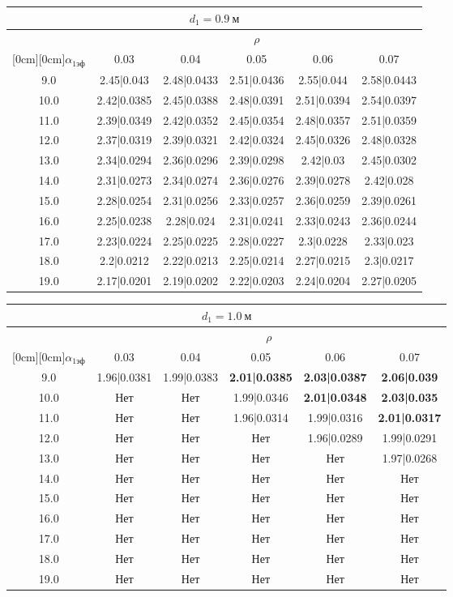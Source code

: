 \documentclass[20pt]{article}
\begin{document}
\begin{center}
\begin{tabular}{c|ccccc}
\hline
	\multicolumn{6}{c}{$d_{1}=0.9 \ м$} \\
\hline
	 & \multicolumn{5}{|c}{$\rho$} \\
	\cline{2-6}
	\raisebox{1.5ex}[0cm][0cm]{$\alpha_{1эф}$} & 0.03 & 0.04 & 0.05 & 0.06 & 0.07\\
\hline
	9.0 & 	2.45|0.043 & 	2.48|0.0433 & 	2.51|0.0436 & 	2.55|0.044 & 	2.58|0.0443\\
	10.0 & 	2.42|0.0385 & 	2.45|0.0388 & 	2.48|0.0391 & 	2.51|0.0394 & 	2.54|0.0397\\
	11.0 & 	2.39|0.0349 & 	2.42|0.0352 & 	2.45|0.0354 & 	2.48|0.0357 & 	2.51|0.0359\\
	12.0 & 	2.37|0.0319 & 	2.39|0.0321 & 	2.42|0.0324 & 	2.45|0.0326 & 	2.48|0.0328\\
	13.0 & 	2.34|0.0294 & 	2.36|0.0296 & 	2.39|0.0298 & 	2.42|0.03 & 	2.45|0.0302\\
	14.0 & 	2.31|0.0273 & 	2.34|0.0274 & 	2.36|0.0276 & 	2.39|0.0278 & 	2.42|0.028\\
	15.0 & 	2.28|0.0254 & 	2.31|0.0256 & 	2.33|0.0257 & 	2.36|0.0259 & 	2.39|0.0261\\
	16.0 & 	2.25|0.0238 & 	2.28|0.024 & 	2.31|0.0241 & 	2.33|0.0243 & 	2.36|0.0244\\
	17.0 & 	2.23|0.0224 & 	2.25|0.0225 & 	2.28|0.0227 & 	2.3|0.0228 & 	2.33|0.023\\
	18.0 & 	2.2|0.0212 & 	2.22|0.0213 & 	2.25|0.0214 & 	2.27|0.0215 & 	2.3|0.0217\\
	19.0 & 	2.17|0.0201 & 	2.19|0.0202 & 	2.22|0.0203 & 	2.24|0.0204 & 	2.27|0.0205\\
\end{tabular}

\begin{tabular}{c|ccccc}
\hline
	\multicolumn{6}{c}{$d_{1}=1.0 \ м$} \\
\hline
	 & \multicolumn{5}{|c}{$\rho$} \\
	\cline{2-6}
	\raisebox{1.5ex}[0cm][0cm]{$\alpha_{1эф}$} & 0.03 & 0.04 & 0.05 & 0.06 & 0.07\\
\hline
	9.0 & 	1.96|0.0381 & 	1.99|0.0383 & 	\textbf{2.01|0.0385} & 	\textbf{2.03|0.0387} & 	\textbf{2.06|0.039}\\
	10.0 & 	Нет & 	Нет & 	1.99|0.0346 & 	\textbf{2.01|0.0348} & 	\textbf{2.03|0.035}\\
	11.0 & 	Нет & 	Нет & 	1.96|0.0314 & 	1.99|0.0316 & 	\textbf{2.01|0.0317}\\
	12.0 & 	Нет & 	Нет & 	Нет & 	1.96|0.0289 & 	1.99|0.0291\\
	13.0 & 	Нет & 	Нет & 	Нет & 	Нет & 	1.97|0.0268\\
	14.0 & 	Нет & 	Нет & 	Нет & 	Нет & 	Нет\\
	15.0 & 	Нет & 	Нет & 	Нет & 	Нет & 	Нет\\
	16.0 & 	Нет & 	Нет & 	Нет & 	Нет & 	Нет\\
	17.0 & 	Нет & 	Нет & 	Нет & 	Нет & 	Нет\\
	18.0 & 	Нет & 	Нет & 	Нет & 	Нет & 	Нет\\
	19.0 & 	Нет & 	Нет & 	Нет & 	Нет & 	Нет\\
\end{tabular}

\end{center}
\end{document}
